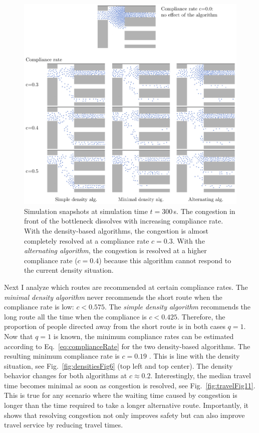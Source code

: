\begin{figure}[H]
\includegraphics[width=\textwidth]{../figures/investigation/VergleichUmleitalgorithmen/snapshots/snapshotscollected.pdf} 
\caption{ Simulation snapshots at simulation time $t=300$\,s. The congestion in front of the bottleneck dissolves with increasing compliance rate. With the density-based algorithms, the congestion is almost completely resolved at a compliance rate $c=0.3$. With the \textit{alternating algorithm}, the congestion is resolved at a higher compliance rate ($c=0.4$) because this algorithm cannot respond to the current density situation.
}
\label{fig:snapshotscomparison}
\end{figure}

Next I analyze which routes are recommended at certain compliance rates. The \textit{minimal density algorithm} never recommends the short route when the compliance rate is low: $c<0.575$. 
The \textit{simple density algorithm} recommends the long route all the time when the compliance is $c<0.425$. Therefore, the proportion of people directed away from the short route is in both cases $q=1$. Now that $q=1$ is known, the minimum compliance rates can be estimated according to  Eq.~\ref{eq:complianceRate} for the two density-based algorithms. The resulting minimum compliance rate is $c=0.19$ . This is line with the density situation, see Fig.~\ref{fig:densitiesFig6} (top left and top center). The density behavior changes for both algorithms at $c\approx0.2$. 
Interestingly, the median travel time becomes minimal as soon as congestion is resolved, see Fig.~\ref{fig:travelFig11}. This is true for any scenario where the waiting time caused by congestion is longer than the time required to take a longer alternative route. Importantly, it shows that resolving congestion not only improves safety but can also improve travel service by reducing travel times.

